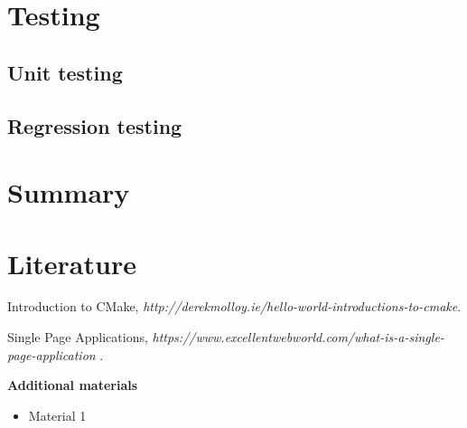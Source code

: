 \documentclass[a4paper,12pt]{article}
\begin{document}
\section{Testing}
\subsection{Unit testing}
\subsection{Regression testing}
\section{Summary}
\section{Literature}
{

\begin{thebibliography}{9}

  Introduction to CMake,
  \emph{http://derekmolloy.ie/hello-world-introductions-to-cmake}.
  
  Single Page Applications,
  \emph{https://www.excellentwebworld.com/what-is-a-single-page-application }.

\end{thebibliography}

\textbf{Additional materials} \begin{itemize}
	\item Material 1
\end{itemize}

}
\newpage

\linespread{1.3}
\selectfont
\end{document}

